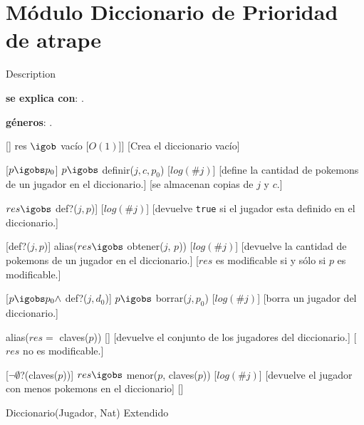 \section{Módulo Diccionario de Prioridad de atrape}
	Description %

\begin{Interfaz}
	\textbf{se explica con}: . 

	\textbf{géneros}: .


	[]
	{res $\igob$ vacío}
	[$O(1)$]]
	[Crea el diccionario vacío]

	[$p \igobs p_0$]
	{$p \igobs$ definir($j, c, p_0$)}
	[$log(\#j)$]
	[define la cantidad de pokemons de un jugador en el diccionario.]
	[se almacenan copias de $j$ y $c$.]

	{$res \igobs$ def?($j, p$)]}
	[$log(\#j)$]
	[devuelve \texttt{true} si el jugador esta definido en el diccionario.]

	[def?($j, p$)]
	{alias($res \igobs$ obtener($j$, $p$))}
	[$log(\#j)$]
	[devuelve la cantidad de pokemons de un jugador en el diccionario.]
	[$res$ es modificable si y sólo si $p$ es modificable.]

	[$p \igobs p_0 \land$ def?($j, d_0$)]
	{$p \igobs$ borrar($j, p_0$)}
	[$log(\#j)$]
	[borra un jugador del diccionario.]

	{alias($res =$ claves($p$))}
	[]%
	[devuelve el conjunto de los jugadores del diccionario.]
	[$res$ no es modificable.]

	[$\neg\emptyset$?(claves($p$))]
	{$res \igobs$ menor($p$, claves($p$))}
	[$log(\#j)$]
	[devuelve el jugador con menos pokemons en el diccionario]
	[]


  \begin{tad}{Diccionario(Jugador, Nat) Extendido}
    \parskip=0pt
    
    \tadAxiomas
  \end{tad}

\end{Interfaz}


